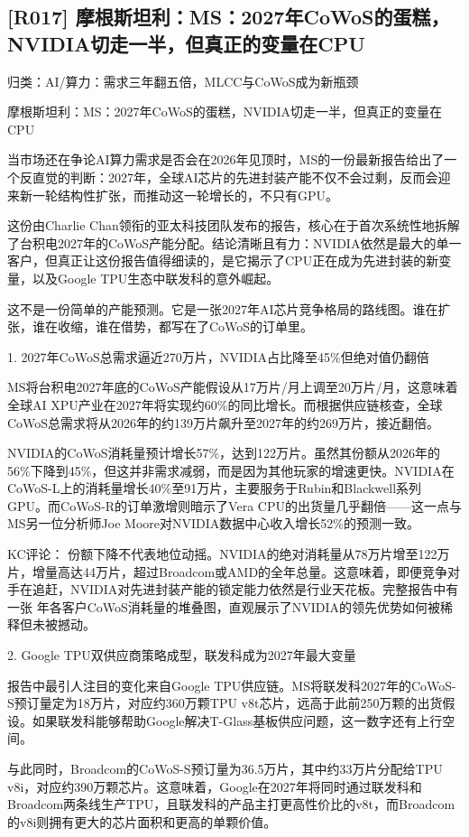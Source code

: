 \documentclass[11pt]{ctexart}
\begin{document}
\subsection{[R017] 摩根斯坦利：MS：2027年CoWoS的蛋糕，NVIDIA切走一半，但真正的变量在CPU}
{\small\color{refgray}归类：AI/算力：需求三年翻五倍，MLCC与CoWoS成为新瓶颈}

摩根斯坦利：MS：2027年CoWoS的蛋糕，NVIDIA切走一半，但真正的变量在CPU

当市场还在争论AI算力需求是否会在2026年见顶时，MS的一份最新报告给出了一个反直觉的判断：2027年，全球AI芯片的先进封装产能不仅不会过剩，反而会迎来新一轮结构性扩张，而推动这一轮增长的，不只有GPU。

这份由Charlie Chan领衔的亚太科技团队发布的报告，核心在于首次系统性地拆解了台积电2027年的CoWoS产能分配。结论清晰且有力：NVIDIA依然是最大的单一客户，但真正让这份报告值得细读的，是它揭示了CPU正在成为先进封装的新变量，以及Google TPU生态中联发科的意外崛起。

这不是一份简单的产能预测。它是一张2027年AI芯片竞争格局的路线图。谁在扩张，谁在收缩，谁在借势，都写在了CoWoS的订单里。

1. 2027年CoWoS总需求逼近270万片，NVIDIA占比降至45\%但绝对值仍翻倍

MS将台积电2027年底的CoWoS产能假设从17万片/月上调至20万片/月，这意味着全球AI XPU产业在2027年将实现约60\%的同比增长。而根据供应链核查，全球CoWoS总需求将从2026年的约139万片飙升至2027年的约269万片，接近翻倍。

NVIDIA的CoWoS消耗量预计增长57\%，达到122万片。虽然其份额从2026年的56\%下降到45\%，但这并非需求减弱，而是因为其他玩家的增速更快。NVIDIA在CoWoS-L上的消耗量增长40\%至91万片，主要服务于Rubin和Blackwell系列GPU。而CoWoS-R的订单激增则暗示了Vera CPU的出货量几乎翻倍——这一点与MS另一位分析师Joe Moore对NVIDIA数据中心收入增长52\%的预测一致。

KC评论： 份额下降不代表地位动摇。NVIDIA的绝对消耗量从78万片增至122万片，增量高达44万片，超过Broadcom或AMD的全年总量。这意味着，即便竞争对手在追赶，NVIDIA对先进封装产能的锁定能力依然是行业天花板。完整报告中有一张 年各客户CoWoS消耗量的堆叠图，直观展示了NVIDIA的领先优势如何被稀释但未被撼动。

2. Google TPU双供应商策略成型，联发科成为2027年最大变量

报告中最引人注目的变化来自Google TPU供应链。MS将联发科2027年的CoWoS-S预订量定为18万片，对应约360万颗TPU v8t芯片，远高于此前250万颗的出货假设。如果联发科能够帮助Google解决T-Glass基板供应问题，这一数字还有上行空间。

与此同时，Broadcom的CoWoS-S预订量为36.5万片，其中约33万片分配给TPU v8i，对应约390万颗芯片。这意味着，Google在2027年将同时通过联发科和Broadcom两条线生产TPU，且联发科的产品主打更高性价比的v8t，而Broadcom的v8i则拥有更大的芯片面积和更高的单颗价值。
\end{document}
